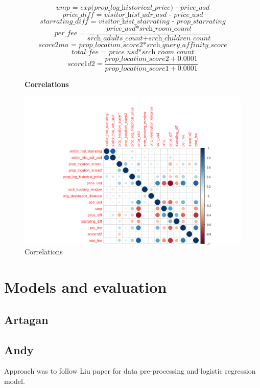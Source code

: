 \documentclass{llncs}
\begin{document}
\[\textit{ump = exp(prop\_ log\_ historical\_ price) - price\_ usd}\]
\[\textit{price\_ diff = visitor\_ hist\_ adr\_ usd - price\_ usd}\]
\[\textit{starrating\_ diff = visitor\_ hist\_ starrating - prop\_ starrating}\]
\[\textit{per\_ fee} = \frac{\textit{price\_ usd*srch\_ room\_ count}}{\textit{srch\_ adults\_ count+srch\_ children\_ count}}\]
\[\textit{score2ma = prop\_ location\_ score2*srch\_ query\_ affinity\_ score}\]
\[\textit{total\_ fee = price\_ usd*srch\_ room\_ count}\]
\[ \textit{score1d2} = \frac{\textit{prop\_ location\_ score2} + 0.0001}{\textit{prop\_ location\_ score1} + 0.0001}\]

	\begin{figure}[H]
	\centering
	\textbf{Correlations}\par\medskip
		\includegraphics[scale=0.3]{figures/corr_plot.png}
	\caption{Correlations}
	\end{figure}


\section{Models and evaluation}

\subsection*{Artagan}

\subsection*{Andy}

Approach was to follow Liu paper for data pre-processing and logistic regression model.
\end{document}
